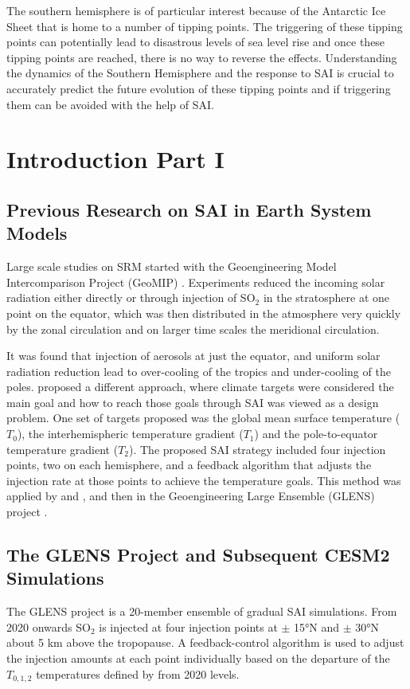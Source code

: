 The southern hemisphere is of particular interest because of the Antarctic Ice Sheet that is home to a number of tipping points. The triggering of these tipping points can potentially lead to disastrous levels of sea level rise and once these tipping points are reached, there is no way to reverse the effects. Understanding the dynamics of the Southern Hemisphere and the response to SAI is crucial to accurately predict the future evolution of these tipping points and if triggering them can be avoided with the help of SAI. 

\newpage
\section{Introduction Part I}
\subsection{Previous Research on SAI in Earth System Models}
Large scale studies on SRM started with the Geoengineering Model Intercomparison Project (GeoMIP) \parencite{geomip2011}. Experiments reduced the incoming solar radiation either directly or through injection of SO$_2$ in the stratosphere at one point on the equator, which was then distributed in the atmosphere very quickly by the zonal circulation and on larger time scales the meridional circulation.

It was found that injection of aerosols at just the equator, and uniform solar radiation reduction lead to over-cooling of the tropics and under-cooling of the poles. \textcite{kravitz2016} proposed a different approach, where climate targets were considered the main goal and how to reach those goals through SAI was viewed as a design problem. One set of targets proposed was the global mean surface temperature ($T_0$), the interhemispheric temperature gradient ($T_1$) and the pole-to-equator temperature gradient ($T_2$). The proposed SAI strategy included four injection points, two on each hemisphere, and a feedback algorithm that adjusts the injection rate at those points to achieve the temperature goals. This method was applied by \textcite{kravitz2017} and \textcite{macmartin2017}, and then in the Geoengineering Large Ensemble (GLENS) project \parencite{tilmes2018}. 

\subsection{The GLENS Project and Subsequent CESM2 Simulations}
The GLENS project is a 20-member ensemble of gradual SAI simulations. From 2020 onwards SO$_2$ is injected at four injection points at $\pm$ 15°N and $\pm$ 30°N about 5 km above the tropopause. A feedback-control algorithm is used to adjust the injection amounts at each point individually based on the departure of the $T_{0,1,2}$ temperatures defined by \textcite{kravitz2016} from 2020 levels.

